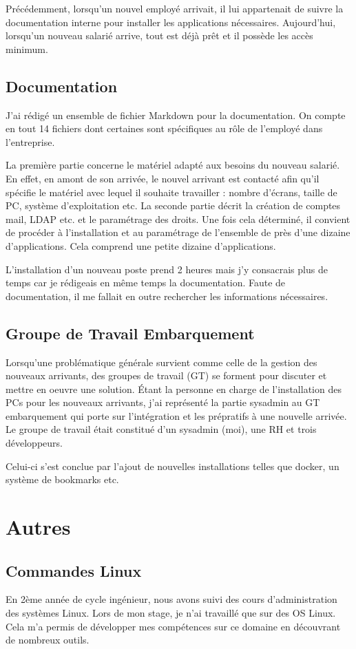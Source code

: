 \documentclass[12pt, a4paper, twoside]{article}
\begin{document}
Précédemment, lorsqu'un nouvel employé arrivait, il lui appartenait de suivre la documentation interne pour installer les applications nécessaires.
Aujourd'hui, lorsqu'un nouveau salarié arrive, tout est déjà prêt et il possède les accès minimum. 

\subsection{Documentation}
J'ai rédigé un ensemble de fichier \gls{Markdown} pour la documentation. 
On compte en tout 14 fichiers dont certaines sont spécifiques au rôle de l'employé dans l'entreprise.

La première partie concerne le matériel adapté aux besoins du nouveau salarié.
En effet, en amont de son arrivée, le nouvel arrivant est contacté afin qu'il spécifie le matériel avec lequel il souhaite travailler : nombre d'écrans, taille de PC, système d'exploitation etc.
La seconde partie décrit la création de comptes mail, \gls{LDAP} etc. et le paramétrage des droits.
Une fois cela déterminé, il convient de procéder à l'installation et au paramétrage de l'ensemble de près d'une dizaine d'applications.
Cela comprend une petite dizaine d'applications.

L'installation d'un nouveau poste prend 2 heures mais j'y consacrais plus de temps car je rédigeais en même temps la documentation.
Faute de documentation, il me fallait en outre rechercher les informations nécessaires.

\subsection{Groupe de Travail Embarquement}
Lorsqu'une problématique générale survient comme celle de la gestion des nouveaux arrivants, des groupes de travail (GT) se forment pour discuter et mettre en oeuvre une solution.
Étant la personne en charge de l'installation des PCs pour les nouveaux arrivants, j'ai représenté la partie sysadmin au GT embarquement qui porte sur l'intégration et les prépratifs à une nouvelle arrivée.
Le groupe de travail était constitué d'un sysadmin (moi), une RH et trois développeurs.

Celui-ci s'est conclue par l'ajout de nouvelles installations telles que docker, un système de bookmarks etc.
\newpage
\section{Autres}
\subsection{Commandes Linux}
En 2ème année de cycle ingénieur, nous avons suivi des cours d'administration des systèmes \gls{Linux}.
Lors de mon stage, je n'ai travaillé que sur des OS \gls{Linux}.
Cela m'a permis de développer mes compétences sur ce domaine en découvrant de nombreux outils.
\end{document}
